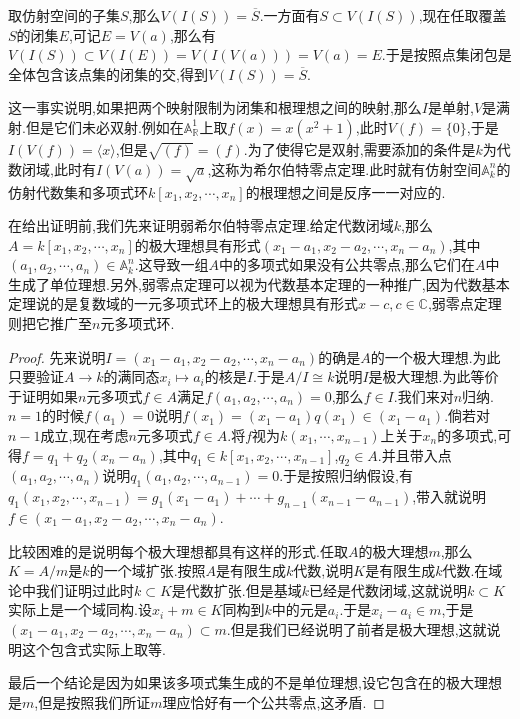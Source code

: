 取仿射空间的子集$S$,那么$V(I(S))=\overline{S}$.一方面有$S\subset V(I(S))$,现在任取覆盖$S$的闭集$E$,可记$E=V(a)$,那么有$V(I(S))\subset V(I(E))=V(I(V(a)))=V(a)=E$.于是按照点集闭包是全体包含该点集的闭集的交,得到$V(I(S))=\overline{S}$.

这一事实说明,如果把两个映射限制为闭集和根理想之间的映射,那么$I$是单射,$V$是满射.但是它们未必双射.例如在$\mathbb{A}_{\mathbb{R}}^1$上取$f(x)=x(x^2+1)$,此时$V(f)=\{0\}$,于是$I(V(f))=\langle x\rangle$,但是$\sqrt{(f)}=(f)$.为了使得它是双射,需要添加的条件是$k$为代数闭域,此时有$I(V(a))=\sqrt{a}$,这称为希尔伯特零点定理.此时就有仿射空间$\mathbb{A}_k^n$的仿射代数集和多项式环$k[x_1,x_2,\cdots,x_n]$的根理想之间是反序一一对应的.

在给出证明前,我们先来证明弱希尔伯特零点定理.给定代数闭域$k$,那么$A=k[x_1,x_2,\cdots,x_n]$的极大理想具有形式$(x_1-a_1,x_2-a_2,\cdots,x_n-a_n)$,其中$(a_1,a_2,\cdots,a_n)\in\mathbb{A}_k^n$.这导致一组$A$中的多项式如果没有公共零点,那么它们在$A$中生成了单位理想.另外,弱零点定理可以视为代数基本定理的一种推广,因为代数基本定理说的是复数域的一元多项式环上的极大理想具有形式$x-c,c\in\mathbb{C}$,弱零点定理则把它推广至$n$元多项式环.
\begin{proof}
	
	先来说明$I=(x_1-a_1,x_2-a_2,\cdots,x_n-a_n)$的确是$A$的一个极大理想.为此只要验证$A\to k$的满同态$x_i\mapsto a_i$的核是$I$.于是$A/I\cong k$说明$I$是极大理想.为此等价于证明如果$n$元多项式$f\in A$满足$f(a_1,a_2,\cdots,a_n)=0$,那么$f\in I$.我们来对$n$归纳.$n=1$的时候$f(a_1)=0$说明$f(x_1)=(x_1-a_1)q(x_1)\in(x_1-a_1)$.倘若对$n-1$成立,现在考虑$n$元多项式$f\in A$.将$f$视为$k(x_1,\cdots,x_{n-1})$上关于$x_n$的多项式,可得$f=q_1+q_2(x_n-a_n)$,其中$q_1\in k[x_1,x_2,\cdots,x_{n-1}]$,$q_2\in A$.并且带入点$(a_1,a_2,\cdots,a_n)$说明$q_1(a_1,a_2,\cdots,a_{n-1})=0$.于是按照归纳假设,有$q_1(x_1,x_2,\cdots,x_{n-1})=g_1(x_1-a_1)+\cdots+g_{n-1}(x_{n-1}-a_{n-1})$,带入就说明$f\in(x_1-a_1,x_2-a_2,\cdots,x_n-a_n)$.
	
	比较困难的是说明每个极大理想都具有这样的形式.任取$A$的极大理想$m$,那么$K=A/m$是$k$的一个域扩张.按照$A$是有限生成$k$代数,说明$K$是有限生成$k$代数.在域论中我们证明过此时$k\subset K$是代数扩张.但是基域$k$已经是代数闭域,这就说明$k\subset K$实际上是一个域同构.设$x_i+m\in K$同构到$k$中的元是$a_i$.于是$x_i-a_i\in m$,于是$(x_1-a_1,x_2-a_2,\cdots,x_n-a_n)\subset m$.但是我们已经说明了前者是极大理想,这就说明这个包含式实际上取等.
	
	最后一个结论是因为如果该多项式集生成的不是单位理想,设它包含在的极大理想是$m$,但是按照我们所证$m$理应恰好有一个公共零点,这矛盾.
\end{proof}

